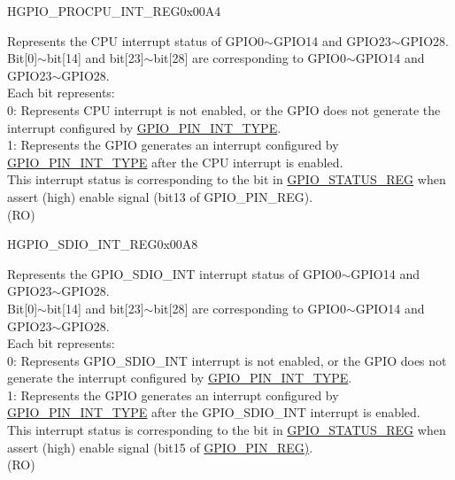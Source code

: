 \begin{register}{H}{GPIO\_PROCPU\_INT\_REG}{0x00A4}\label{regdesc:GPIOPROCPUINTREG}
%
\regnewline%
\begin{regdesc}\begin{reglist}
\label{fielddesc:GPIOPROCPUINT}\item [GPIO\_PROCPU\_INT] Represents the CPU interrupt status of GPIO0$\sim$GPIO14 and GPIO23$\sim$GPIO28.\\ 
Bit[0]$\sim$bit[14] and bit[23]$\sim$bit[28] are corresponding to GPIO0$\sim$GPIO14 and GPIO23$\sim$GPIO28.\\
Each bit represents:\\
0: Represents CPU interrupt is not enabled, or the GPIO does not generate the interrupt configured by \hyperref[fielddesc:GPIOPINNINTTYPE]{GPIO\_PIN\_INT\_TYPE}.\\
1: Represents the GPIO generates an interrupt configured by \hyperref[fielddesc:GPIOPINNINTTYPE]{GPIO\_PIN\_INT\_TYPE} after the CPU interrupt is enabled.\\
This interrupt status is corresponding to the bit in \hyperref[regdesc:GPIOSTATUSREG]{GPIO\_STATUS\_REG} when assert (high) enable signal (bit13 of \hyperref[regdesc:GPIOPINNREG]{}GPIO\_PIN\_REG). \\ (RO)
\end{reglist}\end{regdesc}
\end{register}


\begin{register}{H}{GPIO\_SDIO\_INT\_REG}{0x00A8}\label{regdesc:GPIOSDIOINTREG}
%
\regnewline%
\begin{regdesc}\begin{reglist}
\label{fielddesc:GPIOSDIOINT}\item [GPIO\_SDIO\_INT] Represents the GPIO\_SDIO\_INT interrupt status of GPIO0$\sim$GPIO14 and GPIO23$\sim$GPIO28.\\ 
Bit[0]$\sim$bit[14] and bit[23]$\sim$bit[28] are corresponding to GPIO0$\sim$GPIO14 and GPIO23$\sim$GPIO28.\\
Each bit represents:\\
0: Represents GPIO\_SDIO\_INT interrupt is not enabled, or the GPIO does not generate the interrupt configured by \hyperref[fielddesc:GPIOPINNINTTYPE]{GPIO\_PIN\_INT\_TYPE}.\\
1: Represents the GPIO generates an interrupt configured by \hyperref[fielddesc:GPIOPINNINTTYPE]{GPIO\_PIN\_INT\_TYPE} after the GPIO\_SDIO\_INT interrupt is enabled.\\
This interrupt status is corresponding to the bit in \hyperref[regdesc:GPIOSTATUSREG]{GPIO\_STATUS\_REG} when assert (high) enable signal (bit15 of \hyperref[regdesc:GPIOPINNREG]{GPIO\_PIN\_REG)}. \\ (RO)
\end{reglist}\end{regdesc}
\end{register}


